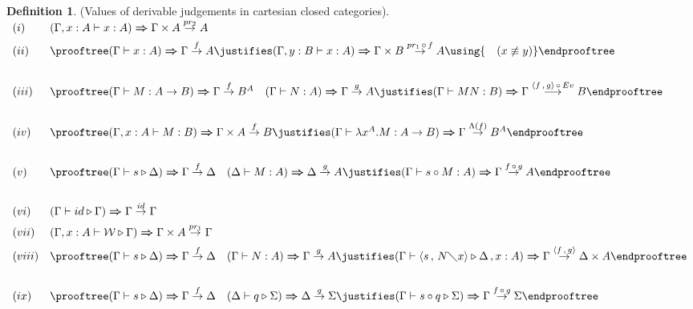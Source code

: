 \documentclass[11pt]{amsart}
\def\ruleone#1#2{\prooftree #1 \justifies #2 \endprooftree}
\def\ruletwo#1#2#3{\ruleone{#1\quad #2}{#3}}
\theoremstyle{plain}
\theoremstyle{definition}
\newtheorem{definition}[theorem]{Definition}
\theoremstyle{remark}
\numberwithin{equation}{section}
\newcommand{\tri}{\triangleright}
\newcommand{\ci}{\circ}
\newcommand{\mi}{\,,\,}
\newcommand{\is}{\diagdown}
\newcommand{\arrow}{\rightarrow}
\newcommand{\la}{\langle}
\newcommand{\ra}{\rangle}
\renewcommand{\pi}{\mathcal{W}}
\begin{document}
\begin{definition}(Values of derivable judgements in cartesian closed categories).\label{modeli}\\[5pt]
 $
\begin{array}{ll}
(i)& (\Gamma,x:A\vdash x:A)\boldsymbol{\Rightarrow}  \Gamma\times A\overset{pr_2}{\arrow}A \\[5pt]
 (ii)& \ruleone{(\Gamma\vdash
x:A)\boldsymbol{\Rightarrow}  \Gamma\overset{f}{\arrow}A}{(\Gamma,y:B\vdash x:A)\boldsymbol{\Rightarrow} \Gamma\times B\overset{pr_1\,\circ\, f}{\arrow}A\using {\quad(x\not\equiv y)}}\\[20pt]
 (iii)& \ruletwo{(\Gamma\vdash M:A\arrow B)\boldsymbol{\Rightarrow}  \Gamma\overset{f}{\arrow}B^A}{(\Gamma\vdash N:A)\boldsymbol{\Rightarrow } \Gamma\overset{g}{\arrow}A}{(\Gamma\vdash
MN:B)\boldsymbol{\Rightarrow}  \Gamma\overset{\la f\mi g\ra\,\circ\, Ev}{\longrightarrow}B}\\[20pt]
 (iv)& \ruleone{(\Gamma,x:A\vdash M:B)\boldsymbol{\Rightarrow }  \Gamma\times A\overset{f}{\arrow}B}{(\Gamma\vdash\lambda x^A.M:A\arrow B)\boldsymbol{\Rightarrow}  \Gamma\overset{\Lambda (f)}{\arrow}B^A}\\[20pt]
 (v)& \ruletwo{(\Gamma\vdash s \tri\Delta)\boldsymbol{\Rightarrow}  \Gamma\overset{f}{\arrow}\Delta }{(\Delta\vdash M:A)\boldsymbol{\Rightarrow }  \Delta\overset{g}{\arrow}A}{(\Gamma\vdash
 s \ci M:A)\boldsymbol{\Rightarrow }  \Gamma\overset{f\,\circ\, g}{\arrow}A}\\[20pt]
(vi)& (\Gamma\vdash id \tri\Gamma)\boldsymbol{\Rightarrow}  \Gamma\overset{id}{\arrow}\Gamma \\[5pt]
(vii)& (\Gamma,x:A\vdash\pi \tri\Gamma)\boldsymbol{\Rightarrow}   \Gamma\times A\overset{pr_1}{\arrow}\Gamma  \\[5pt]
(viii)& \ruletwo{(\Gamma\vdash s
\tri\Delta)\boldsymbol{\Rightarrow}
 \Gamma\overset{f}{\arrow}\Delta  }{(\Gamma\vdash
N:A)\boldsymbol{\Rightarrow}
\Gamma\overset{g}{\arrow}A}{(\Gamma\vdash
\langle s\mi N\is x\rangle \tri\Delta\, ,x:A)\boldsymbol{\Rightarrow} \Gamma\overset{\la f\mi g\rangle }{\arrow}\Delta\times A}\\[20pt]
(ix)& \ruletwo{(\Gamma\vdash s \tri\Delta)\boldsymbol{\Rightarrow}
 \Gamma\overset{f}{\arrow}\Delta }{(\Delta\vdash q
\tri\Sigma)\boldsymbol{\Rightarrow}
\Delta\overset{g}{\arrow}\Sigma }{(\Gamma \vdash s \ci q
\tri\Sigma)\boldsymbol{\Rightarrow}  \Gamma\overset{f\,\circ\, g}{\arrow}\Sigma }\\
\end{array}
$
\end{definition}$ $\\[10pt]
\end{document}

